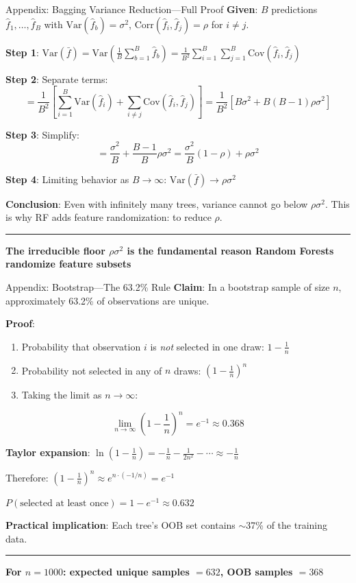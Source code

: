 \documentclass[8pt,aspectratio=169]{beamer}
\newcommand{\bottomnote}[1]{%
\vfill
\vspace{-2mm}
\textcolor{mllavender2}{\rule{\textwidth}{0.4pt}}
\vspace{1mm}
\footnotesize
\textbf{#1}
}
\begin{document}
\begin{frame}[t]{Appendix: Bagging Variance Reduction---Full Proof}
\textbf{Given}: $B$ predictions $\hat{f}_1, \ldots, \hat{f}_B$ with $\text{Var}(\hat{f}_b) = \sigma^2$, $\text{Corr}(\hat{f}_i, \hat{f}_j) = \rho$ for $i \neq j$.

\vspace{0.2em}
\textbf{Step 1}: $\text{Var}(\bar{f}) = \text{Var}\!\left(\frac{1}{B}\sum_{b=1}^B \hat{f}_b\right) = \frac{1}{B^2}\sum_{i=1}^B\sum_{j=1}^B \text{Cov}(\hat{f}_i, \hat{f}_j)$

\vspace{0.2em}
\textbf{Step 2}: Separate terms:
\[
= \frac{1}{B^2}\!\left[\sum_{i=1}^B \text{Var}(\hat{f}_i) + \sum_{i \neq j} \text{Cov}(\hat{f}_i, \hat{f}_j)\right] = \frac{1}{B^2}\!\left[B\sigma^2 + B(B\!-\!1)\rho\sigma^2\right]
\]

\textbf{Step 3}: Simplify:
\[
= \frac{\sigma^2}{B} + \frac{B-1}{B}\rho\sigma^2 = \frac{\sigma^2}{B}(1 - \rho) + \rho\sigma^2
\]

\textbf{Step 4}: Limiting behavior as $B \to \infty$: \; $\text{Var}(\bar{f}) \to \rho\sigma^2$

\textbf{Conclusion}: Even with infinitely many trees, variance cannot go below $\rho\sigma^2$. This is why RF adds feature randomization: to reduce $\rho$.
\bottomnote{The irreducible floor $\rho\sigma^2$ is the fundamental reason Random Forests randomize feature subsets}
\end{frame}

\begin{frame}[t]{Appendix: Bootstrap---The 63.2\% Rule}
\textbf{Claim}: In a bootstrap sample of size $n$, approximately 63.2\% of observations are unique.

\vspace{0.3em}
\textbf{Proof}:
\begin{enumerate}
\item Probability that observation $i$ is \textit{not} selected in one draw: $1 - \frac{1}{n}$
\item Probability not selected in any of $n$ draws: $\left(1 - \frac{1}{n}\right)^n$
\item Taking the limit as $n \to \infty$:
\end{enumerate}
\[
\lim_{n \to \infty} \left(1 - \frac{1}{n}\right)^n = e^{-1} \approx 0.368
\]

\textbf{Taylor expansion}: $\ln\!\left(1 - \frac{1}{n}\right) = -\frac{1}{n} - \frac{1}{2n^2} - \cdots \approx -\frac{1}{n}$

Therefore: $\left(1 - \frac{1}{n}\right)^n \approx e^{n \cdot (-1/n)} = e^{-1}$

\vspace{0.3em}
$P(\text{selected at least once}) = 1 - e^{-1} \approx 0.632$

\textbf{Practical implication}: Each tree's OOB set contains $\sim$37\% of the training data.
\bottomnote{For $n = 1000$: expected unique samples $= 632$, OOB samples $= 368$}
\end{frame}
\end{document}
